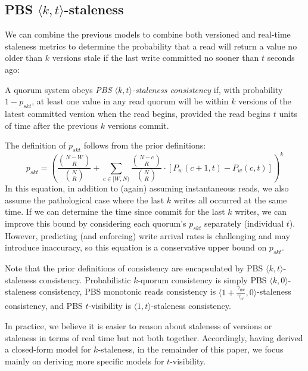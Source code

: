 \documentclass{vldb}
\newcommand{\subsectionskip}{-0em}
\begin{document}
\vspace{\subsectionskip}\subsection{PBS $\langle k, t \rangle$-staleness}

We can combine the previous models to combine both versioned and
real-time staleness metrics to determine the probability that a read
will return a value no older than $k$ versions stale if the last write
committed no sooner than $t$ seconds ago:
\begin{definition}
A quorum system obeys \textit{PBS $\langle k, t \rangle$-staleness
  consistency} if, with probability $1-p_{skt}$, at least one value in
any read quorum will be within $k$ versions of the latest committed
version when the read begins, provided the read begins $t$ units of
time after the previous $k$ versions commit.
\end{definition}
The definition of $p_{skt}$ follows from the prior definitions:
\begin{equation}
p_{skt} = (\frac{{N-W \choose R}}{{N \choose R}}+\sum_{c\in[W, N)} \frac{{N-c \choose R}}{{N \choose R}} \cdot [P_w(c+1, t)-P_w(c,t)])^k
\end{equation}
In this equation, in addition to (again) assuming instantaneous reads,
we also assume the pathological case where the last $k$ writes all
occurred at the same time.  If we can determine the time since commit
for the last $k$ writes, we can improve this bound by considering each
quorum's $p_{skt}$ separately (individual $t$).  However, predicting
(and enforcing) write arrival rates is challenging and may introduce
inaccuracy, so this equation is a conservative upper bound on
$p_{skt}$.

Note that the prior definitions of consistency are encapsulated by PBS
$\langle k, t \rangle$-staleness consistency. Probabilistic $k$-quorum
consistency is simply PBS $\langle k, 0 \rangle$-staleness consistency,
PBS monotonic reads consistency is $\langle
1+\frac{\gamma_{gw}}{\gamma_{cr}}, 0 \rangle$-staleness consistency, and
PBS $t$-visibility is $\langle 1, t \rangle$-staleness consistency.

In practice, we believe it is easier to reason about staleness of
versions or staleness in terms of real time but not both together.
Accordingly, having derived a closed-form model for $k$-staleness, in
the remainder of this paper, we focus mainly on deriving more specific models
for $t$-visibility.
\end{document}
